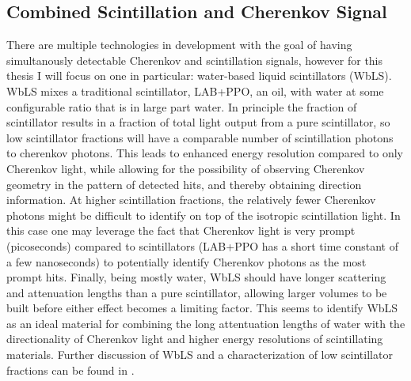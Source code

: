 \subsection{Combined Scintillation and Cherenkov Signal}

There are multiple technologies in development with the goal of having simultanously detectable Cherenkov and scintillation signals, however for this thesis I will focus on one in particular: water-based liquid scintillators (WbLS).
WbLS mixes a traditional scintillator, LAB+PPO, an oil, with water at some configurable ratio that is in large part water.
In principle the fraction of scintillator results in a fraction of total light output from a pure scintillator, so low scintillator fractions will have a comparable number of scintillation photons to cherenkov photons. 
This leads to enhanced energy resolution compared to only Cherenkov light, while allowing for the possibility of observing Cherenkov geometry in the pattern of detected hits, and thereby obtaining direction information.
At higher scintillation fractions, the relatively fewer Cherenkov photons might be difficult to identify on top of the isotropic scintillation light.
In this case one may leverage the fact that Cherenkov light is very prompt (picoseconds) compared to scintillators (LAB+PPO has a short time constant of a few nanoseconds) to potentially identify Cherenkov photons as the most prompt hits.
Finally, being mostly water, WbLS should have longer scattering and attenuation lengths than a pure scintillator, allowing larger volumes to be built before either effect becomes a limiting factor.
This seems to identify WbLS as an ideal material for combining the long attentuation lengths of water with the directionality of Cherenkov light and higher energy resolutions of scintillating materials.
Further discussion of WbLS and a characterization of low scintillator fractions can be found in .


